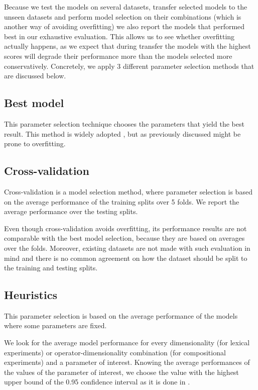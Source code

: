 Because we test the models on several datasets, transfer selected models to the unseen datasets and perform model selection on their combinations (which is another way of avoiding overfitting) we also report the models that performed best in our exhaustive evaluation. This allows us to see whether overfitting actually happens, as we expect that during transfer the models with the highest scores will degrade their performance more than the models selected more conservatively. Concretely, we apply 3 different parameter selection methods that are discussed below.

\subsection{Best model}

This parameter selection technique chooses the parameters that yield the best result. This method is widely adopted \cite{mitchell-lapata:2008:ACLMain,Grefenstette:2011:ESC:2145432.2145580,milajevs-purver:2014:CVSC,milajevs-EtAl:2014:EMNLP2014}, but as previously discussed might be prone to overfitting.

\subsection{Cross-validation}

Cross-validation is a model selection method, where parameter selection is based on the average performance of the training splits over 5 folds. We report the average performance over the testing splits.

Even though cross-validation avoids overfitting, its performance results are not comparable with the best model selection, because they are based on averages over the folds. Moreover, existing datasets are not made with such evaluation in mind \cite{W16-2506} and there is no common agreement on how the dataset should be split to the training and testing splits.

\subsection{Heuristics}

This parameter selection is based on the average performance of the models where some parameters are fixed.

We look for the average model performance for every dimensionality (for lexical experiments) or operator-dimensionality combination (for compositional experiments) and a parameter of interest. Knowing the average performances of the values of the parameter of interest, we choose the value with the highest upper bound of the 0.95 confidence interval as it is done in .

